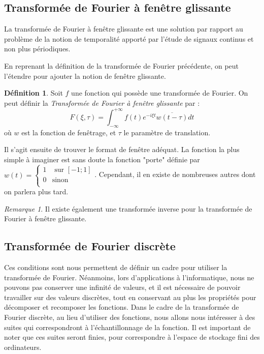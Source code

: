 \documentclass[]{article}
\theoremstyle{remark}
\newtheorem{myrem}{Remarque}
\theoremstyle{definition}
\newtheorem{mydef}{Définition}
\begin{document}
	\subsection{Transformée de Fourier à fenêtre glissante}
	La transformée de Fourier à fenêtre glissante est une solution par rapport au problème de la notion de temporalité apporté par l'étude de signaux continus et non plus périodiques. 

	En reprenant la définition de la transformée de Fourier précédente, on peut l'étendre pour ajouter la notion de fenêtre glissante. 
		
	\begin{mydef}
		Soit $f$ une fonction qui possède une transformée de Fourier. On peut définir la \textit{Transformée de Fourier à fenêtre glissante} par :
		$$ F(\xi, \tau)= \int_{-\infty}^{+\infty}f(t)e^{-i \xi t} \overline{w(t - \tau)}dt$$
		où $w$ est la fonction de fenêtrage, et $\tau$ le paramètre de translation. 
	\end{mydef}
	Il s'agit ensuite de trouver le format de fenêtre adéquat. La fonction la plus simple à imaginer est sans doute la fonction "porte" définie par 
	$w(t) = \left\{
		\begin{array}{cc}
		1 & \text{ sur }[-1; 1] \\
		0 & \text{sinon} \\
		\end{array}
	\right. $.
	Cependant, il en existe de nombreuses autres dont on parlera plus tard. 
	
	\begin{myrem}
		Il existe également une transformée inverse pour la transformée de Fourier à fenêtre glissante. 
	\end{myrem}
	
	\subsection{Transformée de Fourier discrète}
			
	Ces conditions sont nous permettent de définir un cadre pour utiliser la transformée de Fourier. Néanmoins, lors d'applications à l'informatique, nous ne pouvons pas conserver une infinité de valeurs, et il est nécessaire de pouvoir travailler sur des valeurs discrètes, tout en conservant au plus les propriétés pour décomposer et recomposer les fonctions. 		
	Dans le cadre de la transformée de Fourier discrète, au lieu d'utiliser des fonctions, nous allons nous intéresser à des suites qui correspondront à l'échantillonnage de la fonction. Il est important de noter que ces suites seront finies, pour correspondre à l'espace de stockage fini des ordinateurs. 
	
\end{document}

